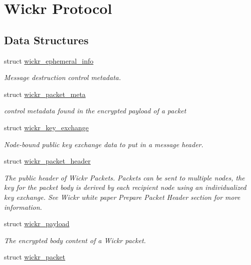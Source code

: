 \hypertarget{group__wickr__protocol}{}\section{Wickr Protocol}
\label{group__wickr__protocol}
\subsection*{Data Structures}
\begin{DoxyCompactItemize}
\item 
struct \hyperlink{structwickr__ephemeral__info}{wickr\+\_\+ephemeral\+\_\+info}
\begin{DoxyCompactList}\small\item\em Message destruction control metadata. \end{DoxyCompactList}\item 
struct \hyperlink{structwickr__packet__meta}{wickr\+\_\+packet\+\_\+meta}
\begin{DoxyCompactList}\small\item\em control metadata found in the encrypted payload of a packet \end{DoxyCompactList}\item 
struct \hyperlink{structwickr__key__exchange}{wickr\+\_\+key\+\_\+exchange}
\begin{DoxyCompactList}\small\item\em Node-\/bound public key exchange data to put in a message header. \end{DoxyCompactList}\item 
struct \hyperlink{structwickr__packet__header}{wickr\+\_\+packet\+\_\+header}
\begin{DoxyCompactList}\small\item\em The public header of Wickr Packets. Packets can be sent to multiple nodes, the key for the packet body is derived by each recipient node using an individualized key exchange. See Wickr white paper \textquotesingle{}Prepare Packet Header\textquotesingle{} section for more information. \end{DoxyCompactList}\item 
struct \hyperlink{structwickr__payload}{wickr\+\_\+payload}
\begin{DoxyCompactList}\small\item\em The encrypted body content of a Wickr packet. \end{DoxyCompactList}\item 
struct \hyperlink{structwickr__packet}{wickr\+\_\+packet}

\end{DoxyCompactItemize}
